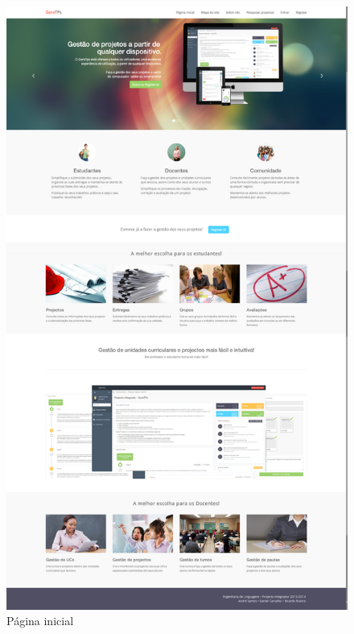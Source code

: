 \begin{figure}[H]
  \centering
  \includegraphics[width=.7\textwidth,center]{images/implementacao/home_page}
  \caption{Página inicial}
  \label{fig:home_page}
\end{figure}
